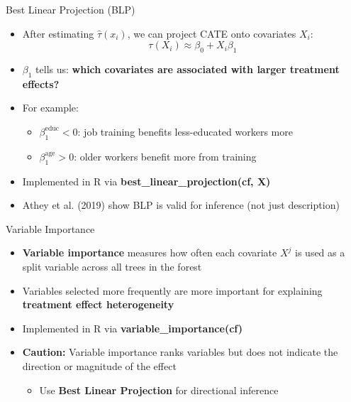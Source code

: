 \documentclass[hyperref={pdfpagelabels=false}]{beamer}
\begin{document}
\begin{frame}{Best Linear Projection (BLP)}
	\begin{itemize}
		\item After estimating $\hat{\tau}(x_i)$, we can project CATE onto covariates $X_i$:
		\begin{equation*}
			\tau(X_i) \approx \beta_0 + X_i \beta_1
		\end{equation*}
		\vspace{0.2cm}
		\item $\beta_1$ tells us: \textbf{which covariates are associated with larger treatment effects?}
		\vspace{0.3cm}
		\item For example:
		\vspace{0.2cm}
		\begin{itemize}
			\item $\beta_1^{\text{educ}} < 0$: job training benefits less-educated workers more
			\vspace{0.2cm}
			\item $\beta_1^{\text{age}} > 0$: older workers benefit more from training
		\end{itemize}
		\vspace{0.3cm}
		\item Implemented in R via \textbf{best\_linear\_projection(cf, X)}
		\vspace{0.3cm}
		\item Athey et al. (2019) show BLP is valid for inference (not just description)
	\end{itemize}
\end{frame}




\begin{frame}{Variable Importance}
	\begin{itemize}
		\item \textbf{Variable importance} measures how often each covariate $X^j$ is used as a split variable across all trees in the forest
		\vspace{0.3cm}
		\item Variables selected more frequently are more important for explaining \textbf{treatment effect heterogeneity}
		\vspace{0.3cm}
		\item Implemented in R via \textbf{variable\_importance(cf)}
		\vspace{0.3cm}
		\item \textbf{Caution:} Variable importance ranks variables but does not indicate the direction or magnitude of the effect
		\vspace{0.2cm}
		\begin{itemize}
			\item Use \textbf{Best Linear Projection} for directional inference
		\end{itemize}
	\end{itemize}
\end{frame}
\end{document}
